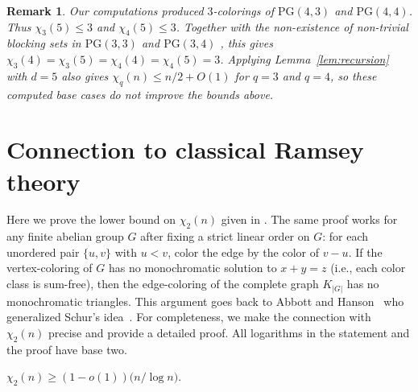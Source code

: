 \documentclass[11pt]{article}
\theoremstyle{plain}
\newtheorem{remark}{Remark}
\newcommand{\PG}{\mathrm{PG}}
\newenvironment{repproposition}[1]{%
  \renewcommand\theinnerprop{\ref*{#1}}%
  \innerprop
}{\endinnerprop}
\begin{document}
\begin{remark}
Our computations \cite{Bishnoi2025} produced $3$-colorings of $\PG(4,3)$ and $\PG(4,4)$.
Thus $\chi_3(5)\le 3$ and $\chi_4(5)\le 3$.
Together with the non-existence of non-trivial blocking sets in $\PG(3,3)$ and $\PG(3,4)$
\cite{Tallini1988,Cassetta1998}, this gives $
\chi_3(4)=\chi_3(5)=\chi_4(4)=\chi_4(5)=3$. 
Applying Lemma~\ref{lem:recursion} with $d=5$ also gives $\chi_q(n)\le n/2+O(1)$ for $q=3$ and $q=4$, so these computed base cases do not improve the bounds above.
\end{remark}

\section{Connection to classical Ramsey theory}\label{sec:lower}
Here we prove the lower bound on $\chi_2(n)$ given in .
The same proof works for any finite abelian group $G$ after fixing a strict linear order on $G$: for each unordered pair $\{u,v\}$ with $u<v$, color the edge by the color of $v-u$.
If the vertex-coloring of $G$ has no monochromatic solution to $x+y=z$ (i.e., each color class is sum-free), then the edge-coloring of the complete graph $K_{|G|}$ has no monochromatic triangles. This argument goes back to Abbott and Hanson~\cite{AbbottHanson1972} who generalized Schur's idea~\cite{Schur1917}. For completeness, we make the connection with $\chi_2(n)$ precise and provide a detailed proof. All logarithms in the statement and the proof have base two.

\begin{repproposition}{prop:chin-lower}
 $\chi_2(n)\ge(1 - o(1))\bigl(n/\log n\bigr)$.   
\end{repproposition}
\end{document}
